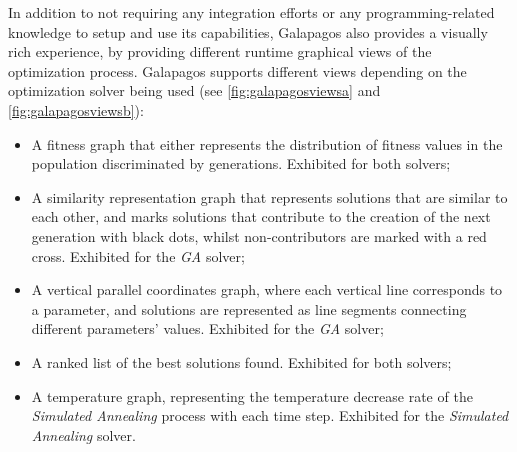 	In addition to not requiring any integration efforts or any programming-related knowledge to setup and use its capabilities, Galapagos also provides a visually rich experience, by providing different runtime graphical views of the optimization process. Galapagos supports different views depending on the optimization solver being used (see \cref{fig:galapagosviewsa} and \cref{fig:galapagosviewsb}):
	\begin{itemize}
		\item A fitness graph that either represents the distribution of fitness values in the population discriminated by generations. Exhibited for both solvers;
		\item A similarity representation graph that represents solutions that are similar to each other, and marks solutions that contribute to the creation of the next generation with black dots, whilst non-contributors are marked with a red cross. Exhibited for the \textit{\ac{GA}} solver;
		\item A vertical parallel coordinates graph, where each vertical line corresponds to a parameter, and solutions are represented as line segments connecting different parameters' values. Exhibited for the \textit{\ac{GA}} solver;
		\item A ranked list of the best solutions found. Exhibited for both solvers;
		\item A temperature graph, representing the temperature decrease rate of the \textit{Simulated Annealing} process with each time step. Exhibited for the \textit{Simulated Annealing} solver.
	\end{itemize}
	

